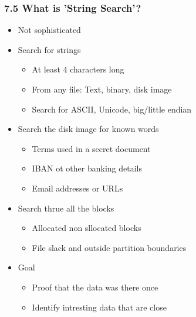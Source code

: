 \begin{frame}[fragile]
  \frametitle{7.5 What is 'String Search'?}
    \begin{itemize}
       \item Not sophisticated
       \item Search for strings
            \begin{itemize}
                \item At least 4 characters long
                \item From any file: Text, binary, disk image
		\item Search for ASCII, Unicode, big/little endian
            \end{itemize}
       \item Search the disk image for known words
            \begin{itemize}
                \item Terms used in a secret document
                \item IBAN ot other banking details
                \item Email addresses or URLs
            \end{itemize}
       \item Search thrue all the blocks
            \begin{itemize}
                \item Allocated non sllocated blocks
                \item File slack and outside partition boundaries
            \end{itemize}
       \item Goal
            \begin{itemize}
                \item Proof that the data was there once
                \item Identify intresting data that are close
            \end{itemize}
    \end{itemize}
\end{frame}


